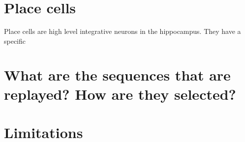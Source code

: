 \documentclass[]{report}
\begin{document}
\section{Place cells}\label{place-cells}
Place cells are high level integrative neurons in the hippocampus. They have a specific

\section{What are the sequences that are replayed? How are they
selected?}\label{what-are-the-sequences-that-are-replayed-how-are-they-selected}

\section{Limitations}\label{limitations}




\end{document}
